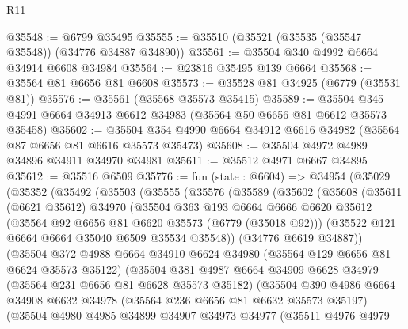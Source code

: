 \begin{lexlean}{R11}
\begin{coremodule}
@35548 := @6799 @35495
@35555 := @35510 (@35521 (@35535 (@35547 @35548)) (@34776 @34887 @34890))
@35561 := @35504 @340 @4992 @6664 @34914 @6608 @34984
@35564 := @23816 @35495 @139 @6664
@35568 := @35564 @81 @6656 @81 @6608
@35573 := @35528 @81 @34925 (@6779 (@35531 @81))
@35576 := @35561 (@35568 @35573 @35415)
@35589 := @35504 @345 @4991 @6664 @34913 @6612 @34983 (@35564 @50 @6656 @81 @6612 @35573 @35458)
@35602 := @35504 @354 @4990 @6664 @34912 @6616 @34982 (@35564 @87 @6656 @81 @6616 @35573 @35473)
@35608 := @35504 @4972 @4989 @34896 @34911 @34970 @34981
@35611 := @35512 @4971 @6667 @34895
@35612 := @35516 @6509
@35776 := fun (state : @6604) =>
  @34954
    (@35029
      (@35352
        (@35492
          (@35503
            (@35555
              (@35576
                (@35589
                  (@35602
                    (@35608
                      (@35611
                        (@6621 @35612)
                        @34970
                        (@35504
                          @363
                          @193
                          @6664
                          @6666
                          @6620
                          @35612
                          (@35564 @92 @6656 @81 @6620 @35573 (@6779 (@35018 @92)))
                          (@35522 @121 @6664 @6664 @35040 @6509 @35534 @35548))
                        (@34776 @6619 @34887))
                      (@35504
                        @372
                        @4988
                        @6664
                        @34910
                        @6624
                        @34980
                        (@35564 @129 @6656 @81 @6624 @35573 @35122)
                        (@35504
                          @381
                          @4987
                          @6664
                          @34909
                          @6628
                          @34979
                          (@35564 @231 @6656 @81 @6628 @35573 @35182)
                          (@35504
                            @390
                            @4986
                            @6664
                            @34908
                            @6632
                            @34978
                            (@35564 @236 @6656 @81 @6632 @35573 @35197)
                            (@35504
                              @4980
                              @4985
                              @34899
                              @34907
                              @34973
                              @34977
                              (@35511
                                @4976
                                @4979

\end{coremodule}
\end{lexlean}
